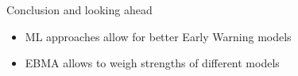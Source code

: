 \documentclass{beamer}
\begin{document}
\begin{frame}{Conclusion and looking ahead}
\begin{itemize}
\item ML approaches allow for better Early Warning models
\item EBMA allows to weigh strengths of different models
\end{itemize}
\end{frame}
\end{document}
